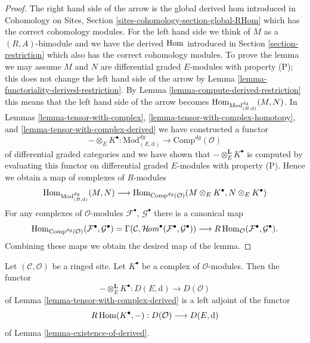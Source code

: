 \begin{proof}
The right hand side of the arrow is the global derived hom introduced
in Cohomology on Sites, Section \ref{sites-cohomology-section-global-RHom}
which has the correct cohomology modules.
For the left hand side we think of $M$ as a $(R, A)$-bimodule and
we have the derived $\mathop{\mathrm{Hom}}\nolimits$ introduced in Section \ref{section-restriction}
which also has the correct cohomology modules.
To prove the lemma we may assume $M$ and $N$ are differential graded
$E$-modules with property (P); this does not change the left hand
side of the arrow by
Lemma \ref{lemma-functoriality-derived-restriction}.
By Lemma \ref{lemma-compute-derived-restriction}
this means that the left hand side of the arrow becomes
$\mathop{\mathrm{Hom}}\nolimits_{\text{Mod}^{dg}_{(B, \text{d})}}(M, N)$.
In Lemmas \ref{lemma-tensor-with-complex},
\ref{lemma-tensor-with-complex-homotopy}, and
\ref{lemma-tensor-with-complex-derived}
we have constructed a functor
$$
- \otimes_E K^\bullet :
\text{Mod}^{dg}_{(E, \text{d})}
\longrightarrow
\text{Comp}^{dg}(\mathcal{O})
$$
of differential graded categories
and we have shown that $- \otimes_E^\mathbf{L} K^\bullet$ is computed
by evaluating this functor
on differential graded $E$-modules with property (P).
Hence we obtain a map of complexes of $R$-modules
$$
\mathop{\mathrm{Hom}}\nolimits_{\text{Mod}^{dg}_{(B, \text{d})}}(M, N)
\longrightarrow
\mathop{\mathrm{Hom}}\nolimits_{\text{Comp}^{dg}(\mathcal{O})}
(M \otimes_E K^\bullet, N \otimes_E K^\bullet)
$$
For any complexes of $\mathcal{O}$-modules
$\mathcal{F}^\bullet$, $\mathcal{G}^\bullet$ there
is a canonical map
$$
\mathop{\mathrm{Hom}}\nolimits_{\text{Comp}^{dg}(\mathcal{O})}
(\mathcal{F}^\bullet, \mathcal{G}^\bullet) =
\Gamma(\mathcal{C},
\mathop{\mathcal{H}\!\mathit{om}}\nolimits^\bullet(\mathcal{F}^\bullet, \mathcal{G}^\bullet))
\longrightarrow
R\mathop{\mathrm{Hom}}\nolimits_\mathcal{O}(\mathcal{F}^\bullet, \mathcal{G}^\bullet).
$$
Combining these maps
we obtain the desired map of the lemma.
\end{proof}

\begin{lemma}
\label{lemma-tensor-with-complex-hom-adjoint}
Let $(\mathcal{C}, \mathcal{O})$ be a ringed site.
Let $K^\bullet$ be a complex of $\mathcal{O}$-modules.
Then the functor
$$
- \otimes_E^\mathbf{L} K^\bullet :
D(E, \text{d})
\longrightarrow
D(\mathcal{O})
$$
of Lemma \ref{lemma-tensor-with-complex-derived} is a left adjoint
of the functor
$$
R\mathop{\mathrm{Hom}}\nolimits(K^\bullet, -) : D(\mathcal{O}) \longrightarrow D(E, \text{d})
$$
of Lemma \ref{lemma-existence-of-derived}.
\end{lemma}

